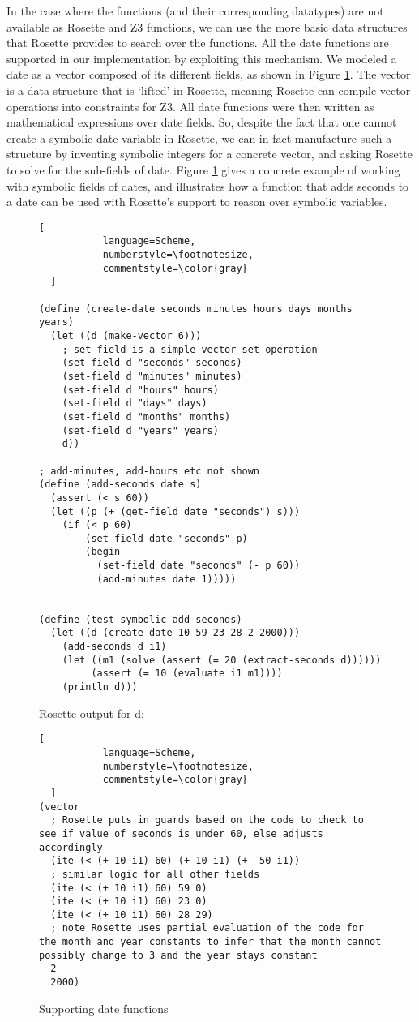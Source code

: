 In the case where the functions (and their corresponding datatypes) are not available as Rosette and Z3 functions, we can use the more basic data structures that Rosette provides to search over the functions.  All the date functions are supported in our implementation by exploiting this mechanism.  We modeled a date as a vector composed of its different fields, as shown in Figure \ref{fig:date}.  The vector is a data structure that is `lifted' in Rosette, meaning Rosette can compile vector operations into constraints for Z3.  All date functions were then written as mathematical expressions over date fields.  So, despite the fact that one cannot create a symbolic date variable in Rosette, we can in fact manufacture such a structure by inventing symbolic integers for a concrete vector, and asking Rosette to solve for the sub-fields of date.  Figure \ref{fig:date} gives a concrete example of working with symbolic fields of dates, and illustrates how a function that adds seconds to a date can be used with Rosette's support to reason over symbolic variables.
\begin{figure}
\caption{Supporting date functions}
\label{fig:date}
\begin{lstlisting}[
           language=Scheme,
           numberstyle=\footnotesize,
           commentstyle=\color{gray}
  ]

(define (create-date seconds minutes hours days months years)
  (let ((d (make-vector 6)))
    ; set field is a simple vector set operation
    (set-field d "seconds" seconds)
    (set-field d "minutes" minutes)
    (set-field d "hours" hours)
    (set-field d "days" days)
    (set-field d "months" months)
    (set-field d "years" years)
    d))

; add-minutes, add-hours etc not shown
(define (add-seconds date s)
  (assert (< s 60))
  (let ((p (+ (get-field date "seconds") s)))
    (if (< p 60)
        (set-field date "seconds" p)
        (begin
          (set-field date "seconds" (- p 60))
          (add-minutes date 1)))))


(define (test-symbolic-add-seconds)
  (let ((d (create-date 10 59 23 28 2 2000)))
    (add-seconds d i1)
    (let ((m1 (solve (assert (= 20 (extract-seconds d))))))
         (assert (= 10 (evaluate i1 m1))))
    (println d)))
\end{lstlisting}

Rosette output for d:
\begin{lstlisting}[
           language=Scheme,
           numberstyle=\footnotesize,
           commentstyle=\color{gray}
  ]
(vector 
  ; Rosette puts in guards based on the code to check to see if value of seconds is under 60, else adjusts accordingly
  (ite (< (+ 10 i1) 60) (+ 10 i1) (+ -50 i1))
  ; similar logic for all other fields
  (ite (< (+ 10 i1) 60) 59 0) 
  (ite (< (+ 10 i1) 60) 23 0) 
  (ite (< (+ 10 i1) 60) 28 29) 
  ; note Rosette uses partial evaluation of the code for the month and year constants to infer that the month cannot possibly change to 3 and the year stays constant
  2 
  2000)

\end{lstlisting}
\end{figure}

